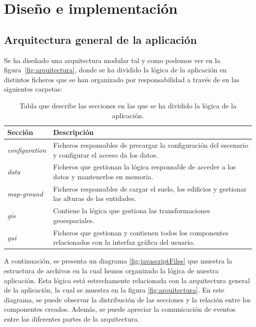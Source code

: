 \documentclass[a4paper, 11pt]{book}
\begin{document}

\clearpage
\chapter{Diseño e implementación}
\label{sec:diseno}
\section{Arquitectura general de la aplicación} 
\label{sec:arquitectura}
Se ha diseñado una arquitectura modular tal y como podemos ver en la figura~\ref{fig:arquitectura}, donde se ha dividido la lógica de la aplicación en distintos ficheros que se han organizado por responsabilidad a través de en las siguientes carpetas:
\begin{table}[h]
	\begin{center}
		\begin{tabular}{|l|p{13cm}|}
			\hline
			\textbf{Sección} & \textbf{Descripción} \\
			\hline
			\emph{configuration} & Ficheros responsables de precargar la configuración del escenario y configurar el acceso da los datos. \\\hline
			\emph{data} & Ficheros que gestionan la lógica responsable de acceder a los datos y mantenerlos en memoria. \\\hline
			\emph{map-ground} & Ficheros responsables de cargar el suelo, los edificios y gestionar las alturas de las entidades. \\\hline
			\emph{gis} & Contiene la lógica que gestiona las transformaciones geoespaciales. \\\hline
			\emph{gui} & Ficheros que gestionan y contienen todos los componentes relacionados con la interfaz gráfica del usuario.\\\hline
		\end{tabular}
		\caption{Tabla que describe las secciones en las que se ha dividido la lógica de la aplicación.}
	\end{center}
\end{table}
A continuación, se presenta un diagrama \ref{fig:javascriptFiles} que muestra la estructura de archivos en la cual hemos organizado la lógica de nuestra aplicación. 
Esta lógica está estrechamente relacionada con la arquitectura general de la aplicación, la cual se muestra en la figura \ref{fig:arquitectura}. En este diagrama, se puede observar la distribución de las secciones y la relación entre los componentes creados. Además, se puede apreciar la comunicación de eventos entre las diferentes partes de la arquitectura.
\end{document}
